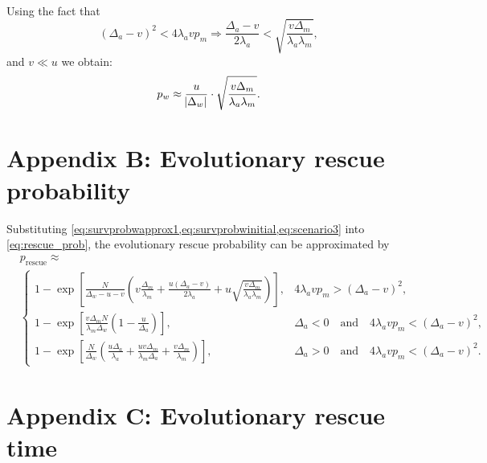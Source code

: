 \documentclass[12pt]{extarticle}
\newcommand{\presc}{p_\text{rescue}}
\begin{document}
\begin{appendices}
\begin{equation}
\begin{aligned}
\end{aligned}
\end{equation}
Using the fact that
\begin{equation*}
\left(\Delta_a-v\right)^2 < 4\lambda_avp_m\Rightarrow\frac{\Delta_a-v}{2\lambda_a} < \sqrt{\frac{v\Delta_m}{\lambda_a\lambda_m}},
\end{equation*}
and $v\ll u$ we obtain:
\begin{equation}
p_w\approx\frac{u}{\abs{\Delta_w}}\cdot\sqrt{\frac{v\Delta_m}{\lambda_a\lambda_m}}.
\end{equation}

\section*{Appendix B: Evolutionary rescue probability}\label{sec:appendix-rescue-prob}

Substituting \cref{eq:survprobwapprox1,eq:survprobwinitial,eq:scenario3} into \cref{eq:rescue_prob}, the evolutionary rescue probability can be approximated by
\begin{equation}\label{rescue_prob_approx}
\begin{aligned}
&\presc \approx \\
  &\begin{cases}
  1-\exp\left[\frac{N}{\Delta_w-u-v}\left(v\frac{\Delta_m}{\lambda_m}+\frac{u\left(\Delta_a-v\right)}{2\lambda_a}+u\sqrt{\frac{v\Delta_m}{\lambda_a\lambda_m}}\right)\right] ,&
  4\lambda_avp_m>\left(\Delta_a-v\right)^2 ,\\
   1-\exp\left[\frac{v\Delta_mN}{\lambda_m\Delta_w}\left(1-\frac{u}{\Delta_a}\right)\right] ,&
   \Delta_a<0\quad\text{and}\quad4\lambda_avp_m<\left(\Delta_a-v\right)^2 ,\\
   1-\exp\left[\frac{N}{\Delta_w}\left(\frac{u\Delta_a}{\lambda_a}+\frac{uv\Delta_m}{\lambda_m\Delta_a}+\frac{v\Delta_m}{\lambda_m}\right)\right] ,&
   \Delta_a>0\quad\text{and}\quad4\lambda_avp_m<\left(\Delta_a-v\right)^2 .
  \end{cases}
\end{aligned}
\end{equation}


\section*{Appendix C: Evolutionary rescue time}


\end{appendices}
\end{document}
